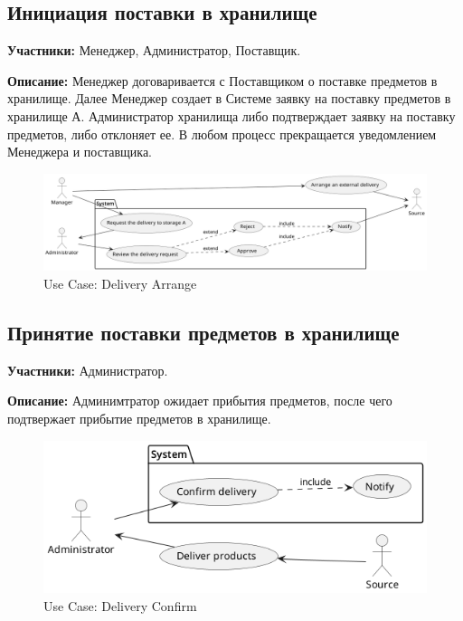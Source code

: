 \subsection{Инициация поставки в хранилище}

\textbf{Участники:}
Менеджер, Администратор, Поставщик.

\textbf{Описание:}
Менеджер договаривается с Поставщиком о
поставке предметов в хранилище. Далее Менеджер 
создает в Системе заявку на поставку предметов в 
хранилище А. Администратор хранилища либо подтверждает 
заявку на поставку предметов, либо отклоняет ее. В 
любом процесс прекращается уведомлением Менеджера и 
поставщика.

\begin{figure}[h]
  \centering
  \includegraphics[width=12cm]{../../doc/spec/figure/usecase/delivery_arrange/Storage Net, Use Case, Delivery Arrange.png}
  \caption{Use Case: Delivery Arrange}
\end{figure}


\subsection{Принятие поставки предметов в хранилище}

\textbf{Участники:}
Администратор.

\textbf{Описание:}
Админимтратор ожидает прибытия предметов, после 
чего подтвержает прибытие предметов в хранилище.

\begin{figure}[h]
  \centering
  \includegraphics[width=12cm]{../../doc/spec/figure/usecase/delivery_confirm/Storage Net, Use Case, Delivery Confirm.png}
  \caption{Use Case: Delivery Confirm}
\end{figure}
